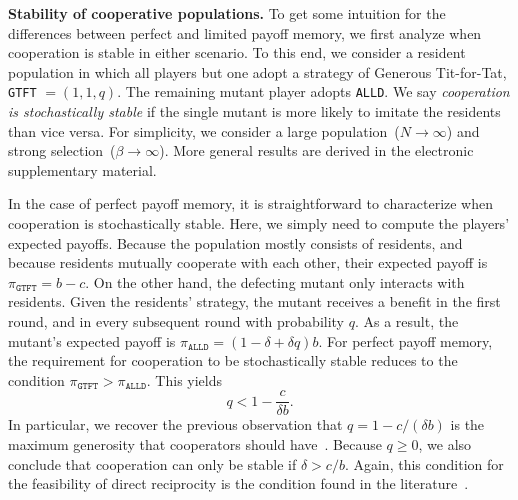 \documentclass[11pt]{article}
\def\alld{\texttt{ALLD}}
\def\gtft{\texttt{GTFT}}
\def\esm{electronic supplementary material}
\theoremstyle{plainCl1}
\theoremstyle{plainCl2}
\begin{document}

\noindent
{\bf Stability of cooperative populations.}
To get some intuition for the differences between perfect and limited payoff memory, we first analyze when cooperation is stable in either scenario.
To this end, we consider a resident population in which all players but one adopt a strategy of Generous Tit-for-Tat, \gtft{} $=\!(1,1,q)$. 
The remaining mutant player adopts \alld. 
We say {\it cooperation is stochastically stable} if the single mutant is more likely to imitate the residents than vice versa. 
For simplicity, we consider a large population~($N\!\rightarrow\!\infty$) and strong selection~($\beta\!\rightarrow\!\infty$).
More general results are derived in the \esm. 


In the case of perfect payoff memory, it is straightforward to characterize when cooperation is stochastically stable. 
Here, we simply need to compute the players' expected payoffs. 
Because the population mostly consists of residents, and because residents mutually cooperate with each other, their expected payoff is $\pi_\gtft = b\!-\!c$. 
On the other hand, the defecting mutant only interacts with residents. 
Given the residents' strategy, the mutant receives a benefit in the first round, and in every subsequent round with probability $q$. 
As a result, the mutant's expected payoff is $\pi_\alld \!=\! (1\!-\!\delta\!+\!\delta q)b$. 
For perfect payoff memory, the requirement for cooperation to be stochastically stable reduces to the condition $\pi_\gtft > \pi_\alld$. 
This yields
\begin{equation} \label{Eq:PerfectMemory}
q < 1\!-\!\frac{c}{\delta  b}.
\end{equation}
In particular, we recover the previous observation that $q\!=\!1-c/(\delta b)$ is the maximum generosity that cooperators should have~\citep{molander:jcr:1985,Nowak1992tit,Schmid:NHB:2021}. 
Because $q\!\ge\!0$, we also conclude that cooperation can only be stable if $\delta \!>\! c/b$.
Again, this condition for the feasibility of direct reciprocity is the condition found in the literature~\citep{nowak:Science:2006}.

\end{document}
